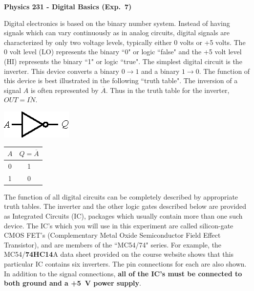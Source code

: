 \documentclass[12pt,oneside,openany,letterpaper]{article}
\begin{document}
\thispagestyle{plain}
\begin{center}
{\large{\bf{\selectfont Physics 231 - Digital Basics (Exp.~7)}}}
\end{center}

\noindent Digital electronics is based on the binary number system. Instead of having signals which
can vary continuously as in analog circuits, digital signals are characterized by only two
voltage levels, typically either 0 volts or +5 volts. The 0 volt level (LO) represents the
binary ``0" or logic ``false" and the +5 volt level (HI) represents the binary ``1" or logic
``true". The simplest digital circuit is the inverter. This device converts a binary $0\to  1$
and a binary $1\to 0$. The function of this device is best illustrated in the following
``truth table". The inversion of a signal $A$ is often represented by $\overline{A}$. Thus in the truth
table for the inverter, $OUT = \overline{IN}$.

\begin{center}
\begin{minipage}[c]{0.3\textwidth}
\includegraphics[width=4 cm]{inverter.eps}
\end{minipage}
\begin{minipage}[c]{0.25\textwidth}
\begin{tabular}{c|c}
$A$ & $Q=\overline{A}$\\
\hline
 0 & 1\\
  1 & 0
\end{tabular}
\end{minipage}
\end{center}

\noindent The function of all digital circuits can be completely described by appropriate truth tables.  The inverter and the other logic gates described below are provided as Integrated
Circuits (IC), packages which usually contain more than one such device. The IC's which
you will use in this experiment are called silicon-gate CMOS FET’s (Complementary
Metal Oxide Semiconductor Field Effect Transistor), and are members of the ``MC54/74"
series. For example, the MC54/{\bf 74HC14}A data sheet provided on the course website
shows that this particular IC contains six inverters. The pin connections for each are also
shown. In addition to the signal connections, {\bf all of the IC's must be connected to both
ground and a +5~V power supply}.
\end{document}

